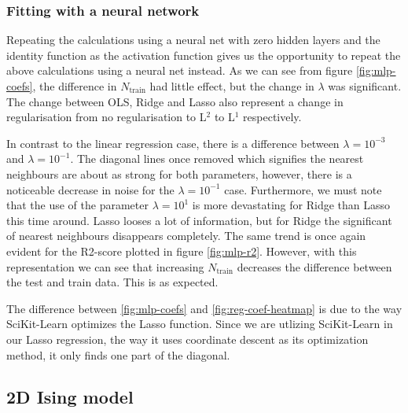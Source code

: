 \subsubsection{Fitting with a neural network}
Repeating the calculations using a neural net with zero hidden layers and the identity function as the activation function gives us the opportunity to repeat the above calculations using a neural net instead. As we can see from figure \ref{fig:mlp-coefs}, the difference in $N_{\text{train}}$ had little effect, but the change in $\lambda$ was significant. The change between OLS, Ridge and Lasso also represent a change in regularisation from no regularisation to L$^2$ to L$^1$ respectively. 

In contrast to the linear regression case, there is a difference between $\lambda = 10^{-3}$ and $\lambda = 10^{-1}$. The diagonal lines once removed which signifies the nearest neighbours are about as strong for both parameters, however, there is a noticeable decrease in noise for the $\lambda = 10^{-1}$ case. Furthermore, we must note that the use of the parameter $\lambda = 10^{1}$ is more devastating for Ridge than Lasso this time around. Lasso looses a lot of information, but for Ridge the significant of nearest neighbours disappears completely. The same trend is once again evident for the R2-score plotted in figure \ref{fig:mlp-r2}. However, with this representation we can see that increasing $N_{\text{train}}$ decreases the difference between the test and train data. This is as expected.

The difference between \ref{fig:mlp-coefs} and \ref{fig:reg-coef-heatmap} is due to the way SciKit-Learn optimizes the Lasso function. Since we are utlizing SciKit-Learn in our Lasso regression, the way it uses coordinate descent as its optimization method, it only finds one part of the diagonal.

\subsection{2D Ising model}
